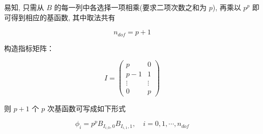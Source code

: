 \documentclass{article}
\begin{document}
易知, 只需从 \(B\) 的每一列中各选择一项相乘(要求二项次数之和为 \(p\)),
再乘以 \(p^p\) 即可得到相应的基函数, 其中取法共有

\[
n_{dof} = {p+1}
\]

构造指标矩阵：

\[
I = \begin{pmatrix}
p  & 0 \\ p-1 & 1 \\ \vdots & \vdots \\ 0 & p
\end{pmatrix}
\]

则 \(p+1\) 个 \(p\) 次基函数可写成如下形式

\[
\phi_i = p^pB_{I_{i,0}, 0}B_{I_{i, 1},1}, \quad i = 0, 1, \cdots, n_{dof}
\]

\cite{wei_fealpy}


\end{document}

